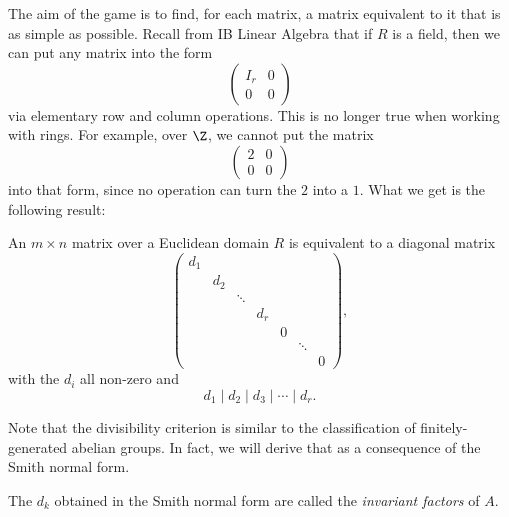 \documentclass[a4paper]{article}
\begin{document}
The aim of the game is to find, for each matrix, a matrix equivalent to it that is as simple as possible. Recall from IB Linear Algebra that if $R$ is a field, then we can put any matrix into the form
\[
  \begin{pmatrix}
    I_r & 0\\
    0 & 0
  \end{pmatrix}
\]
via elementary row and column operations. This is no longer true when working with rings. For example, over $\Z$, we cannot put the matrix
\[
  \begin{pmatrix}
    2 & 0\\
    0 & 0
  \end{pmatrix}
\]
into that form, since no operation can turn the $2$ into a $1$. What we get is the following result:
\begin{thm}
  An $m \times n$ matrix over a Euclidean domain $R$ is equivalent to a diagonal matrix
  \[
    \begin{pmatrix}
      d_1\\
      & d_2\\
      & & \ddots\\
      & & & d_r\\
      & & & & 0\\
      & & & & & \ddots\\
      & & & & & & 0
    \end{pmatrix},
  \]
  with the $d_i$ all non-zero and
  \[
    d_1 \mid d_2 \mid d_3 \mid \cdots \mid d_r.
  \]
\end{thm}
Note that the divisibility criterion is similar to the classification of finitely-generated abelian groups. In fact, we will derive that as a consequence of the Smith normal form.

\begin{defi}
  The $d_k$ obtained in the Smith normal form are called the \emph{invariant factors} of $A$.
\end{defi}
\end{document}
